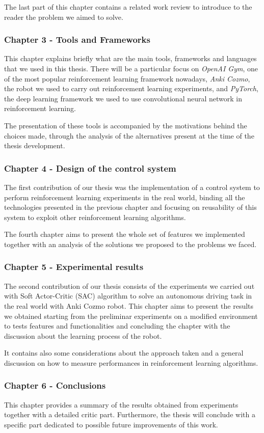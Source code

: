 The last part of this chapter contains a related work review to introduce to the reader the problem we aimed to solve.

\subsubsection*{Chapter 3 - Tools and Frameworks} 

This chapter explains briefly what are the main tools, frameworks and languages that we used in this thesis. There will be a particular focus on \textit{OpenAI Gym}, one of the most popular reinforcement learning framework nowadays, \textit{Anki Cozmo}, the robot we used to carry out reinforcement learning experiments, and \textit{PyTorch}, the deep learning framework we used to use convolutional neural network in reinforcement learning.

The presentation of these tools is accompanied by the motivations behind the choices made, through the analysis of the alternatives present at the time of the thesis development.

\subsubsection*{Chapter 4 - Design of the control system}

The first contribution of our thesis was the implementation of a control system to perform reinforcement learning experiments in the real world, binding all the technologies presented in the previous chapter and focusing on reusability of this system to exploit other reinforcement learning algorithms.

The fourth chapter aims to present the whole set of features we implemented together with an analysis of the solutions we proposed to the problems we faced.

\subsubsection*{Chapter 5 - Experimental results} 

The second contribution of our thesis consists of the experiments we carried out with Soft Actor-Critic (SAC) algorithm to solve an autonomous driving task in the real world with Anki Cozmo robot. This chapter aims to present the results we obtained starting from the preliminar experiments on a modified environment to tests features and functionalities and concluding the chapter with the discussion about the learning process of the robot.

It contains also some considerations about the approach taken and a general discussion on how to measure performances in reinforcement learning algorithms.

\subsubsection*{Chapter 6 - Conclusions} 

This chapter provides a summary of the results obtained from experiments together with a detailed critic part. Furthermore, the thesis will conclude with a specific part dedicated to possible future improvements of this work.